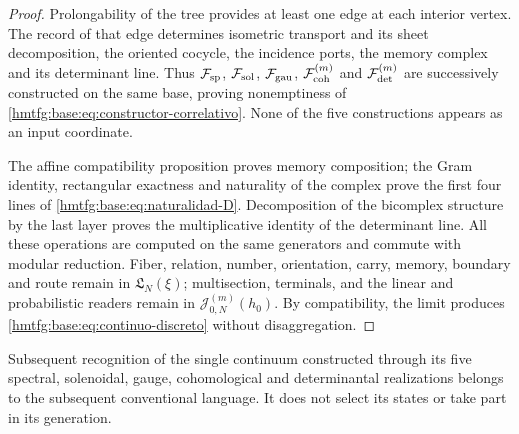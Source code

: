 \begin{proof}
Prolongability of the tree provides at least one edge at each interior vertex. The record of that edge determines isometric transport and its sheet decomposition, the oriented cocycle, the incidence ports, the memory complex and its determinant line. Thus \(\mathcal F_{\rm sp}\), \(\mathcal F_{\rm sol}\), \(\mathcal F_{\rm gau}\), \(\mathcal F_{\rm coh}^{(m)}\) and \(\mathcal F_{\rm det}^{(m)}\) are successively constructed on the same base, proving nonemptiness of \eqref{hmtfg:base:eq:constructor-correlativo}. None of the five constructions appears as an input coordinate.

The affine compatibility proposition proves memory composition; the Gram identity, rectangular exactness and naturality of the complex prove the first four lines of \eqref{hmtfg:base:eq:naturalidad-D}. Decomposition of the bicomplex structure by the last layer proves the multiplicative identity of the determinant line. All these operations are computed on the same generators and commute with modular reduction. Fiber, relation, number, orientation, carry, memory, boundary and route remain in \(\mathfrak L_N(\xi)\); multisection, terminals, and the linear and probabilistic readers remain in \(\mathcal J_{0,N}^{(m)}(h_0)\). By compatibility, the limit produces \eqref{hmtfg:base:eq:continuo-discreto} without disaggregation.
\end{proof}

Subsequent recognition of the single continuum constructed through its five spectral, solenoidal, gauge, cohomological and determinantal realizations belongs to the subsequent conventional language. It does not select its states or take part in its generation.
\fi


